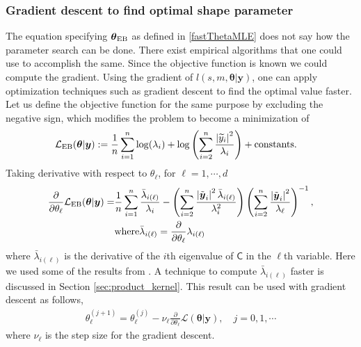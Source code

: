 \documentclass{svjour3}                     %
\newcommand{\bm}[1]{\boldsymbol{#1}}
\newcommand{\vtheta}{{\bm{\theta}}}
\newcommand{\vy}{\bm{y}}
\newcommand{\tvy}{\tilde{\bm{y}}}
\newcommand{\vone}{\bm{1}}
\newcommand{\mC}{\mathsf{C}}
\newcommand{\mCInv}{\mathsf{C}^{-1}}
\newcommand{\MLE}{\textup{EB}}
\def\abs#1{\ensuremath{\left \lvert #1 \right \rvert}}
\begin{document}
\subsubsection{Gradient descent to find optimal shape parameter}
\label{grad_descent_MLE}
The equation specifying $\vtheta_\MLE$ as defined in \eqref{fastThetaMLE} does not say how the parameter search can be done. There exist empirical algorithms \cite{Bre73, For77} that one could use to accomplish the same.
Since the objective function is known we could compute the gradient.
Using the gradient of $l(s,m,\vtheta | \vy)$, one can apply optimization techniques such as gradient descent to find the optimal value faster. Let us define the objective function for the same purpose by excluding the negative sign, which modifies the problem to become a minimization of
\begin{align*}
\mathcal{L}_{\MLE}(\vtheta | \vy)
&:= %
\frac{1}{n}\sum_{i=1}^n \log(\lambda_{i}) + 
\log\left(
\sum_{i=2}^n \frac{\abs{\widetilde{y}_i}^2}{\lambda_{i}}
\right) + \text{constants.}
\end{align*}
Taking derivative with respect to $\theta_\ell$, for $\ell=1,\cdots,d$
\begin{align}
\label{eqn:deriv_obj_func_MLE}
\frac{\partial}{\partial \theta_\ell} \mathcal{L}_{\MLE}(\vtheta | \vy)
= & \frac 1n \sum_{i=1}^{n} \frac{\bar{\lambda}_{i(\ell)}}{\lambda_i}
- \left({ \sum_{i=2}^n \frac{\abs{\tvy_i}^2 \bar{\lambda}_{i(\ell)}}{\lambda_i^2}}\right)
\left( {\sum_{i=2}^n \frac{\abs{\tvy_i}^2}{\lambda_\ell}} \right)^{-1}, \\
& \text{where} \bar{\lambda}_{i(\ell)} = \frac{\partial}{\partial \theta_\ell} {\lambda}_{i(\ell)}
\end{align}
where $\bar{\lambda}_{i(\ell)}$ is the derivative of the $i$th eigenvalue of $\mC$ in the $\ell$th variable. 
Here we used some of the results from \cite{Dong2017a}. A technique to compute $\bar{\lambda}_{i(\ell)}$ faster is discussed in Section \ref{sec:product_kernel}.
This result can be used with gradient descent as follows,
\begin{align}
\label{eqn:deep_descent}
\theta_\ell^{(j+1)} = \theta_\ell^{(j)} - \nu_\ell \frac{\partial}{\partial \theta_\ell} \mathcal{L}(\vtheta | \vy), \quad j=0,1,\cdots
\end{align}
where $\nu_\ell$ is the step size for the gradient descent. 
\end{document}
